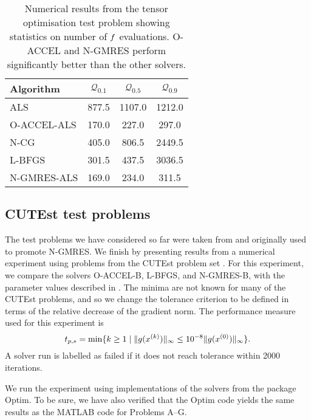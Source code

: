 \documentclass[main.tex]{subfiles}
\begin{document}
\begin{table}[hbtp]
  \centering
  \begin{tabular}{lS[table-auto-round,table-format=4]
    S[table-auto-round,table-format=4]
    S[table-auto-round,table-format=4]}
    \toprule
    Algorithm&{$\mathcal{Q}_{0.1}$}&{$\mathcal{Q}_{0.5}$}&{$\mathcal{Q}_{0.9}$}\\
    \midrule
    ALS&877.5&1107.0&1212.0\\
    O-ACCEL-ALS&170.0&227.0&297.0\\
    N-CG&405.0&806.5&2449.5\\
    L-BFGS&301.5&437.5&3036.5\\
    N-GMRES-ALS&169.0&234.0&311.5\\
    \bottomrule
  \end{tabular}
  \caption{Numerical results from the tensor optimisation test
    problem showing statistics on number of $f$ evaluations. O-ACCEL and N-GMRES perform significantly better than the
    other solvers.}\label{tbl:quantiles_tensor_cp_all}
\end{table}


\subsection{CUTEst test problems}
The test problems we have considered so far were taken from
\citet{sterck2013steepest} and originally used to promote N-GMRES. We
finish by presenting results from a numerical experiment using
problems from the CUTEst problem set \citep{gould2015cutest}.  For this
experiment, we compare the solvers O-ACCEL-B, L-BFGS, and N-GMRES-B,
with the parameter values described in
.  The minima are not known for many of
the CUTEst problems, and so we change the tolerance criterion to be
defined in terms of the relative decrease of the gradient norm.  The
performance measure used for this experiment is
\begin{equation}\label{eq:def_performance_measure_cutest}
  t_{p,s} = \min\{k\geq 1 \mid \|g(x^{(k)})\|_\infty \leq 10^{-8}\|g(x^{(0)})\|_\infty\}.
\end{equation}
A solver run is labelled as failed if it does not reach tolerance
within \num{2000} iterations.

We run the experiment using implementations of the solvers from the
package Optim. To be sure, we have also verified
that the Optim code yields the same results as the MATLAB code for
Problems A--G.
\end{document}
